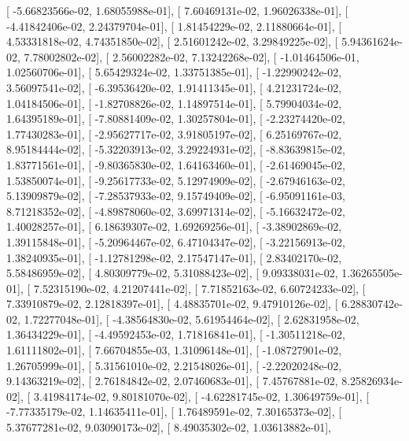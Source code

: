 \documentclass{article}
\begin{document}
       [ -5.66823566e-02,   1.68055988e-01],
       [  7.60469131e-02,   1.96026338e-01],
       [ -4.41842406e-02,   2.24379704e-01],
       [  1.81454229e-02,   2.11880664e-01],
       [  4.53331818e-02,   4.74351850e-02],
       [  2.51601242e-02,   3.29849225e-02],
       [  5.94361624e-02,   7.78002802e-02],
       [  2.56002282e-02,   7.13242268e-02],
       [ -1.01464506e-01,   1.02560706e-01],
       [  5.65429324e-02,   1.33751385e-01],
       [ -1.22990242e-02,   3.56097541e-02],
       [ -6.39536420e-02,   1.91411345e-01],
       [  4.21231724e-02,   1.04184506e-01],
       [ -1.82708826e-02,   1.14897514e-01],
       [  5.79904034e-02,   1.64395189e-01],
       [ -7.80881409e-02,   1.30257804e-01],
       [ -2.23274420e-02,   1.77430283e-01],
       [ -2.95627717e-02,   3.91805197e-02],
       [  6.25169767e-02,   8.95184444e-02],
       [ -5.32203913e-02,   3.29224931e-02],
       [ -8.83639815e-02,   1.83771561e-01],
       [ -9.80365830e-02,   1.64163460e-01],
       [ -2.61469045e-02,   1.53850074e-01],
       [ -9.25617733e-02,   5.12974909e-02],
       [ -2.67946163e-02,   5.13909879e-02],
       [ -7.28537933e-02,   9.15749409e-02],
       [ -6.95091161e-03,   8.71218352e-02],
       [ -4.89878060e-02,   3.69971314e-02],
       [ -5.16632472e-02,   1.40028257e-01],
       [  6.18639307e-02,   1.69269256e-01],
       [ -3.38902869e-02,   1.39115848e-01],
       [ -5.20964467e-02,   6.47104347e-02],
       [ -3.22156913e-02,   1.38240935e-01],
       [ -1.12781298e-02,   2.17547147e-01],
       [  2.83402170e-02,   5.58486959e-02],
       [  4.80309779e-02,   5.31088423e-02],
       [  9.09338031e-02,   1.36265505e-01],
       [  7.52315190e-02,   4.21207441e-02],
       [  7.71852163e-02,   6.60724233e-02],
       [  7.33910879e-02,   2.12818397e-01],
       [  4.48835701e-02,   9.47910126e-02],
       [  6.28830742e-02,   1.72277048e-01],
       [ -4.38564830e-02,   5.61954464e-02],
       [  2.62831958e-02,   1.36434229e-01],
       [ -4.49592453e-02,   1.71816841e-01],
       [ -1.30511218e-02,   1.61111802e-01],
       [  7.66704855e-03,   1.31096148e-01],
       [ -1.08727901e-02,   1.26705999e-01],
       [  5.31561010e-02,   2.21548026e-01],
       [ -2.22020248e-02,   9.14363219e-02],
       [  2.76184842e-02,   2.07460683e-01],
       [  7.45767881e-02,   8.25826934e-02],
       [  3.41984174e-02,   9.80181070e-02],
       [ -4.62281745e-02,   1.30649759e-01],
       [ -7.77335179e-02,   1.14635411e-01],
       [  1.76489591e-02,   7.30165373e-02],
       [  5.37677281e-02,   9.03090173e-02],
       [  8.49035302e-02,   1.03613882e-01],
\end{document}
